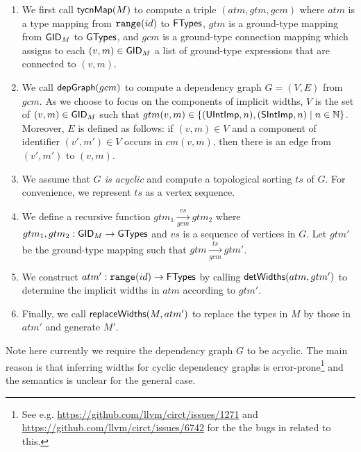 \begin{enumerate}
\item We first call ${\sf tycnMap}(M)$ to compute a triple $(atm, gtm, gcm)$ where $atm$ is a type mapping from $\mathtt{range}(id)$ to ${\sf FTypes}$, $gtm$ is a ground-type mapping from $\mathsf{GID}_M$ to ${\sf GTypes}$,  and $gcm$ is a ground-type connection mapping which assigns to each $(v, m) \in \mathsf{GID}_M$ a list of ground-type expressions that are connected to $(v, m)$. 
%
\item We call ${\sf depGraph}(gcm)$ to compute a dependency graph $G = (V, E)$ from $gcm$. As we choose to focus on the components of implicit widths, $V$ is the set of $(v, m) \in \mathsf{GID}_M$ such that $gtm(v, m) \in \{({\sf UIntImp}, n), ({\sf SIntImp}, n) \mid n \in \mathbb{N}\}$.  
Moreover, $E$ is defined as follows: if $(v, m) \in V$ and a component of identifier $(v', m') \in V$ occurs in $cm(v, m)$, then there is an edge from $(v',m')$ to $(v, m)$. 
%
\item We assume that \emph{$G$ is acyclic} and compute a topological sorting $ts$ of $G$. For convenience, we represent $ts$ as a vertex sequence. 
%
\item We define a recursive function $gtm_1 \xrightarrow[gcm]{vs} gtm_2$ where $gtm_1, gtm_2: \mathsf{GID}_M \rightarrow {\sf GTypes}$ and $vs$ is a sequence of vertices in $G$. Let $gtm'$ be the ground-type mapping such that $gtm \xrightarrow[gcm]{ts} gtm'$. 
%
\item We construct $atm':\mathtt{range}(id) \rightarrow {\sf FTypes}$ by calling ${\sf detWidths}(atm, gtm')$ to determine the implicit widths in $atm$ according to $gtm'$. 
%
\item Finally, we call  ${\sf replaceWidths}(M, atm')$ to replace the types in $M$ by those in $atm'$ and generate $M'$. 
\end{enumerate}

Note here currently we require the dependency graph $G$ to be acyclic. The main reason is that %
inferring widths for cyclic dependency graphs is error-prone\footnote{See e.g. \url{https://github.com/llvm/circt/issues/1271} and \url{https://github.com/llvm/circt/issues/6742} for the the bugs in {\firtool} related to this.} and the semantics is unclear %
for the general case.  
 
